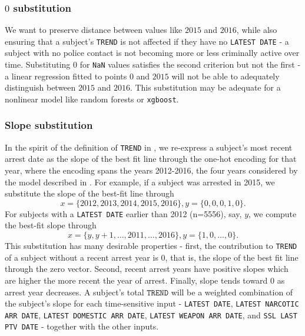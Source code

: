 \subsubsection{$0$ substitution}
 We want to preserve distance between values like $2015$ and $2016$, while also ensuring that a subject's \texttt{TREND} is not affected if they have no \texttt{LATEST DATE} - a subject with no police contact is not becoming more or less criminally active over time. Substituting $0$ for \texttt{NaN} values satisfies the second criterion but not the first -  a linear regression fitted to points $0$ and $2015$ will not be able to adequately distinguish between $2015$ and $2016$. This substitution may be adequate for a nonlinear model like random forests or \texttt{xgboost}.
\subsubsection{Slope substitution}
In the spirit of the definition of \texttt{TREND} in \cite{factsheet}, we re-express a subject's most recent arrest date as the slope of the best fit line through the one-hot encoding for that year, where the encoding spans the years 2012-2016, the four years considered by the model described in \cite{factsheet}. For example, if a subject was arrested in 2015, we substitute the slope of the best-fit line through
\[
x=\{2012,2013,2014,2015,2016\}, y=\{0,0,0,1,0\}.
\]
For subjects with a \texttt{LATEST DATE} earlier than 2012 (n=5556), say, $y$, we compute the best-fit slope through
\[
x=\{y, y+1, \hdots, 2011, \hdots, 2016\}, y=\{1,0, \hdots, 0\}.
\]
This substitution has many desirable properties - first, the contribution to \texttt{TREND} of a subject without a recent arrest year is $0$, that is, the slope of the best fit line through the zero vector. Second, recent arrest years have positive slopes which are higher the more recent the year of arrest. Finally, slope tends toward $0$ as  arrest year decreases. A subject's total $\texttt{TREND}$ will be a weighted combination of the subject's slope for each time-sensitive input - \texttt{LATEST DATE}, \texttt{LATEST NARCOTIC ARR DATE}, \texttt{LATEST DOMESTIC ARR DATE}, \texttt{LATEST WEAPON ARR DATE}, and \texttt{SSL LAST PTV DATE} - together with the other inputs.
